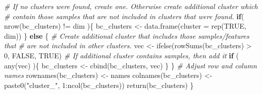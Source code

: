 \documentclass[
]{book}
\newenvironment{Shaded}{\begin{snugshade}}{\end{snugshade}}
\newcommand{\AttributeTok}[1]{\textcolor[rgb]{0.77,0.63,0.00}{#1}}
\newcommand{\CommentTok}[1]{\textcolor[rgb]{0.56,0.35,0.01}{\textit{#1}}}
\newcommand{\ConstantTok}[1]{\textcolor[rgb]{0.00,0.00,0.00}{#1}}
\newcommand{\ControlFlowTok}[1]{\textcolor[rgb]{0.13,0.29,0.53}{\textbf{#1}}}
\newcommand{\DecValTok}[1]{\textcolor[rgb]{0.00,0.00,0.81}{#1}}
\newcommand{\FunctionTok}[1]{\textcolor[rgb]{0.00,0.00,0.00}{#1}}
\newcommand{\NormalTok}[1]{#1}
\newcommand{\OtherTok}[1]{\textcolor[rgb]{0.56,0.35,0.01}{#1}}
\newcommand{\SpecialCharTok}[1]{\textcolor[rgb]{0.00,0.00,0.00}{#1}}
\newcommand{\StringTok}[1]{\textcolor[rgb]{0.31,0.60,0.02}{#1}}
\begin{document}
\begin{Shaded}
\begin{Highlighting}[]
  \CommentTok{\# If no clusters were found, create one. Otherwise create additional cluster which}
  \CommentTok{\# contain those samples that are not included in clusters that were found.}
  \ControlFlowTok{if}\NormalTok{( }\FunctionTok{nrow}\NormalTok{(bc\_clusters) }\SpecialCharTok{!=}\NormalTok{ dim )\{}
\NormalTok{      bc\_clusters }\OtherTok{\textless{}{-}} \FunctionTok{data.frame}\NormalTok{(}\AttributeTok{cluster =} \FunctionTok{rep}\NormalTok{(}\ConstantTok{TRUE}\NormalTok{, dim))}
\NormalTok{  \} }\ControlFlowTok{else}\NormalTok{ \{}
      \CommentTok{\# Create additional cluster that includes those samples/features that}
      \CommentTok{\# are not included in other clusters.}
\NormalTok{      vec }\OtherTok{\textless{}{-}} \FunctionTok{ifelse}\NormalTok{(}\FunctionTok{rowSums}\NormalTok{(bc\_clusters) }\SpecialCharTok{\textgreater{}} \DecValTok{0}\NormalTok{, }\ConstantTok{FALSE}\NormalTok{, }\ConstantTok{TRUE}\NormalTok{)}
      \CommentTok{\# If additional cluster contains samples, then add it}
      \ControlFlowTok{if}\NormalTok{ ( }\FunctionTok{any}\NormalTok{(vec) )\{}
\NormalTok{          bc\_clusters }\OtherTok{\textless{}{-}} \FunctionTok{cbind}\NormalTok{(bc\_clusters, vec)}
\NormalTok{      \}}
\NormalTok{  \}}
  \CommentTok{\# Adjust row and column names}
  \FunctionTok{rownames}\NormalTok{(bc\_clusters) }\OtherTok{\textless{}{-}}\NormalTok{ names}
  \FunctionTok{colnames}\NormalTok{(bc\_clusters) }\OtherTok{\textless{}{-}} \FunctionTok{paste0}\NormalTok{(}\StringTok{"cluster\_"}\NormalTok{, }\DecValTok{1}\SpecialCharTok{:}\FunctionTok{ncol}\NormalTok{(bc\_clusters))}
  \FunctionTok{return}\NormalTok{(bc\_clusters)}
\NormalTok{\}}
\end{Highlighting}
\end{Shaded}

\begin{Shaded}
\end{Shaded}
\end{document}
